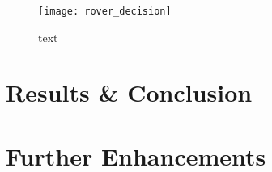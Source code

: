 \documentclass[a4paper]{article}
\begin{document}
\begin{figure}[h]
\centering
\texttt{[image: rover\_decision]}
\caption{text}
\end{figure}

\section{Results \& Conclusion}

\section{Further Enhancements}
\end{document}
